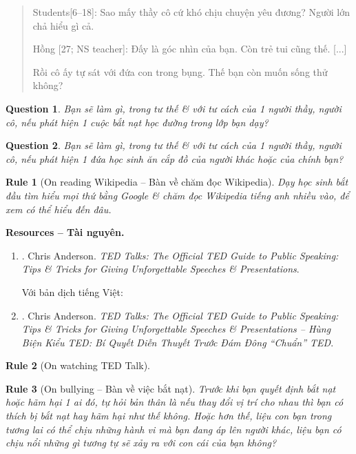 \documentclass[12pt]{article}
\newtheorem{question}{Question}
\newtheorem{Rule}{Rule}
\begin{document}
\begin{quote}
	{\sf Students[6--18]}: Sao mấy thầy cô cứ khó chịu chuyện yêu đương? Người lớn chả hiểu gì cả.
	
	{\sf Hồng [27; NS teacher]}: Đấy là góc nhìn của bạn. Còn trẻ tui cũng thế. [...]
	
	Rồi cô ấy tự sát với đứa con trong bụng. Thế bạn còn muốn sống thử không?
\end{quote}

\begin{question}
	Bạn sẽ làm gì, trong tư thế \& với tư cách của 1 người thầy, người cô, nếu phát hiện 1 cuộc bắt nạt học đường trong lớp bạn dạy?
\end{question}

\begin{question}
	Bạn sẽ làm gì, trong tư thế \& với tư cách của 1 người thầy, người cô, nếu phát hiện 1 đứa học sinh ăn cắp đồ của người khác hoặc của chính bạn?
\end{question}

\begin{Rule}[On reading Wikipedia -- Bàn về chăm đọc Wikipedia]
	Dạy học sinh bắt đầu tìm hiểu mọi thứ bằng Google \& chăm đọc Wikipedia tiếng anh nhiều vào, để xem có thể hiểu đến đâu.
\end{Rule}

\textbf{\textsf{Resources -- Tài nguyên.}}
\begin{enumerate}
	\item \cite{Anderson_TED}. {\sc Chris Anderson}. {\it TED Talks: The Official TED Guide to Public Speaking: Tips \& Tricks for Giving Unforgettable Speeches \& Presentations}.
	
	Với bản dịch tiếng Việt:
	\item \cite{Anderson_TED_VN}. {\sc Chris Anderson}. {\it TED Talks: The Official TED Guide to Public Speaking: Tips \& Tricks for Giving Unforgettable Speeches \& Presentations -- Hùng Biện Kiểu TED: Bí Quyết Diễn Thuyết Trước Đám Đông ``Chuẩn'' TED}.
\end{enumerate}

\begin{Rule}[On watching TED Talk]
	
\end{Rule}

\begin{Rule}[On bullying -- Bàn về việc bắt nạt]
	Trước khi bạn quyết định bắt nạt hoặc hãm hại 1 ai đó, tự hỏi bản thân là nếu thay đổi vị trí cho nhau thì bạn có thích bị bắt nạt hay hãm hại như thế không. Hoặc hơn thế, liệu con bạn trong tương lai có thể chịu những hành vi mà bạn đang áp lên người khác, liệu bạn có chịu nổi những gì tương tự sẽ xảy ra với con cái của bạn không?
\end{Rule}
\end{document}
